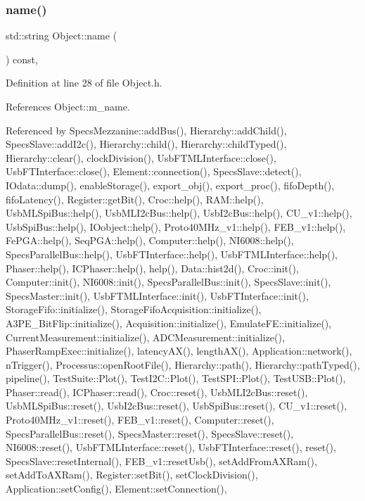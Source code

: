 \subsubsection{\texorpdfstring{name()}{name()}}
{\footnotesize\ttfamily std\+::string Object\+::name (\begin{DoxyParamCaption}{ }\end{DoxyParamCaption}) const\hspace{0.3cm}{\ttfamily [inline]}, {\ttfamily [inherited]}}



Definition at line 28 of file Object.\+h.



References Object\+::m\+\_\+name.



Referenced by Specs\+Mezzanine\+::add\+Bus(), Hierarchy\+::add\+Child(), Specs\+Slave\+::add\+I2c(), Hierarchy\+::child(), Hierarchy\+::child\+Typed(), Hierarchy\+::clear(), clock\+Division(), Usb\+F\+T\+M\+L\+Interface\+::close(), Usb\+F\+T\+Interface\+::close(), Element\+::connection(), Specs\+Slave\+::detect(), I\+Odata\+::dump(), enable\+Storage(), export\+\_\+obj(), export\+\_\+proc(), fifo\+Depth(), fifo\+Latency(), Register\+::get\+Bit(), Croc\+::help(), R\+A\+M\+::help(), Usb\+M\+L\+Spi\+Bus\+::help(), Usb\+M\+L\+I2c\+Bus\+::help(), Usb\+I2c\+Bus\+::help(), C\+U\+\_\+v1\+::help(), Usb\+Spi\+Bus\+::help(), I\+Oobject\+::help(), Proto40\+M\+Hz\+\_\+v1\+::help(), F\+E\+B\+\_\+v1\+::help(), Fe\+P\+G\+A\+::help(), Seq\+P\+G\+A\+::help(), Computer\+::help(), N\+I6008\+::help(), Specs\+Parallel\+Bus\+::help(), Usb\+F\+T\+Interface\+::help(), Usb\+F\+T\+M\+L\+Interface\+::help(), Phaser\+::help(), I\+C\+Phaser\+::help(), help(), Data\+::hist2d(), Croc\+::init(), Computer\+::init(), N\+I6008\+::init(), Specs\+Parallel\+Bus\+::init(), Specs\+Slave\+::init(), Specs\+Master\+::init(), Usb\+F\+T\+M\+L\+Interface\+::init(), Usb\+F\+T\+Interface\+::init(), Storage\+Fifo\+::initialize(), Storage\+Fifo\+Acquisition\+::initialize(), A3\+P\+E\+\_\+\+Bit\+Flip\+::initialize(), Acquisition\+::initialize(), Emulate\+F\+E\+::initialize(), Current\+Measurement\+::initialize(), A\+D\+C\+Measurement\+::initialize(), Phaser\+Ramp\+Exec\+::initialize(), latency\+A\+X(), length\+A\+X(), Application\+::network(), n\+Trigger(), Processus\+::open\+Root\+File(), Hierarchy\+::path(), Hierarchy\+::path\+Typed(), pipeline(), Test\+Suite\+::\+Plot(), Test\+I2\+C\+::\+Plot(), Test\+S\+P\+I\+::\+Plot(), Test\+U\+S\+B\+::\+Plot(), Phaser\+::read(), I\+C\+Phaser\+::read(), Croc\+::reset(), Usb\+M\+L\+I2c\+Bus\+::reset(), Usb\+M\+L\+Spi\+Bus\+::reset(), Usb\+I2c\+Bus\+::reset(), Usb\+Spi\+Bus\+::reset(), C\+U\+\_\+v1\+::reset(), Proto40\+M\+Hz\+\_\+v1\+::reset(), F\+E\+B\+\_\+v1\+::reset(), Computer\+::reset(), Specs\+Parallel\+Bus\+::reset(), Specs\+Master\+::reset(), Specs\+Slave\+::reset(), N\+I6008\+::reset(), Usb\+F\+T\+M\+L\+Interface\+::reset(), Usb\+F\+T\+Interface\+::reset(), reset(), Specs\+Slave\+::reset\+Internal(), F\+E\+B\+\_\+v1\+::reset\+Usb(), set\+Add\+From\+A\+X\+Ram(), set\+Add\+To\+A\+X\+Ram(), Register\+::set\+Bit(), set\+Clock\+Division(), Application\+::set\+Config(), Element\+::set\+Connection(), 